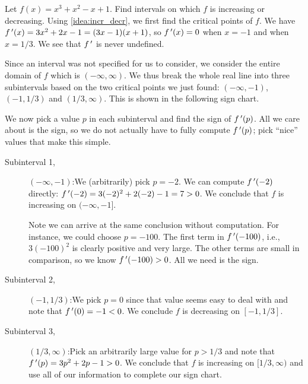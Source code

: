 \begin{example}\label{ex_incr1}%
Let $f(x) = x^3+x^2-x+1$. Find intervals on which $f$ is increasing or decreasing.
\solution
Using \autoref{idea:incr_decr}, we first find the critical points of $f$. We have $f\,'(x) = 3x^2+2x-1 = (3x-1)(x+1)$, so $f\,'(x) = 0$ when $x=-1$ and when $x=1/3$. We see that $f\,'$ is never undefined.

Since an interval was not specified for us to consider, we consider the entire domain of $f$ which is $(-\infty,\infty)$. We thus break the whole real line into three subintervals based on the two critical points we just found: $(-\infty,-1)$, $(-1,1/3)$ and $(1/3,\infty)$. This is shown in the following sign chart.

\begin{center}
\end{center}

We now pick a value $p$ in each subinterval and find the sign of $f\,'(p)$. All we care about is the sign, so we do not actually have to fully compute $f\,'(p)$; pick ``nice'' values that make this simple.

\begin{description}%
\item[Subinterval 1,] $(-\infty,-1)$:\quad We (arbitrarily) pick $p=-2$. We can compute $f\,'(-2)$ directly: $f\,'(-2) = 3(-2)^2+2(-2)-1=7>0$. We conclude that $f$ is increasing on $(-\infty,-1]$.

Note we can arrive at the same conclusion without computation. For instance, we could choose $p=-100$. The first term in $f\,'(-100)$, i.e., $3(-100)^2$ is clearly positive and very large. The other terms are small in comparison, so we know $f\,'(-100)>0$. All we need is the sign.

\item[Subinterval 2,] $(-1,1/3)$:\quad We pick $p=0$ since that value seems easy to deal with and note that $f\,'(0)=-1<0$. We conclude $f$ is decreasing on $[-1,1/3]$.

\item[Subinterval 3,] $(1/3,\infty)$:\quad Pick an arbitrarily large value for $p>1/3$ and note that $f\,'(p)=3p^2+2p-1>0$. We conclude that $f$ is increasing on $[1/3,\infty)$ and use all of our information to complete our sign chart.
\end{description}

\begin{center}
\end{center}


\end{example}
